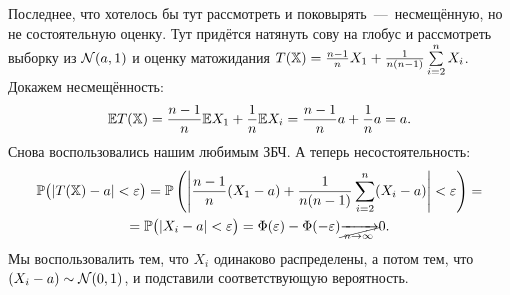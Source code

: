 \documentclass[../TV&MS.tex]{subfiles}
\begin{document}
\begin{Ex}
    Последнее, что хотелось бы тут рассмотреть и поковырять~---~несмещённую, но не состоятельную оценку.
    Тут придётся натянуть сову на глобус и рассмотреть выборку из $\mathcal{N}(a, 1)$ и оценку матожидания $T(\mathbb{X}) = \frac{n-1}{n}X_1 + \frac{1}{n(n-1)}\sum\limits_{i=2}^{n} X_i$.
    Докажем несмещённость:
    \begin{equation}
        \mathbb{E} T(\mathbb{X}) = \frac{n-1}{n} \mathbb{E} X_1 + \frac{1}{n} \mathbb{E} X_i = 
        \frac{n-1}{n}a + \frac{1}{n}a = a
    .\end{equation}
    Снова воспользовались нашим любимым ЗБЧ. А теперь несостоятельность:
    \begin{multline}
        \mathbb{P} \bigl( \left\lvert T(\mathbb{X}) - a \right\rvert < \varepsilon \bigr)
        = \mathbb{P}\left( \left\lvert \frac{n-1}{n}(X_1 - a) +
        \frac{1}{n(n-1)}\sum\limits_{i=2}^{n} (X_i - a) \right\rvert<\varepsilon\right) =\\
        = \mathbb{P} \bigl( \left\lvert X_i - a \right\rvert < \varepsilon \bigr) = 
        \Phi(\varepsilon) - \Phi (-\varepsilon) \cancel{\xrightarrow[n\rightarrow \infty]{}} 0
    .\end{multline} 
    Мы воспользовалить тем, что $X_i$ одинаково распределены, а потом тем,
    что $(X_i - a) \sim \mathcal{N}(0, 1)$, и подставили соответствующую вероятность.
\end{Ex} 

\newpage
\end{document}
